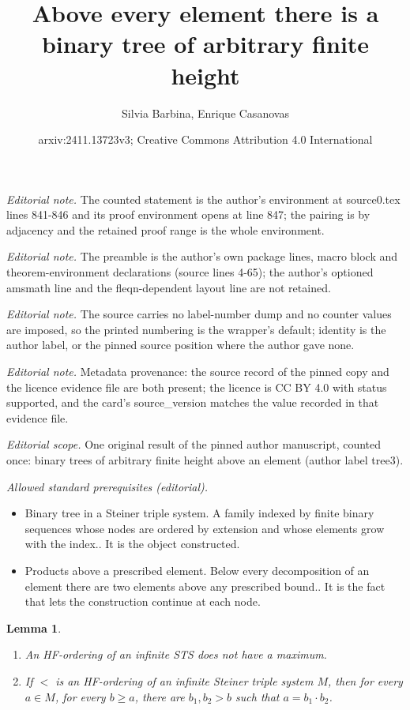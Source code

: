 \documentclass[10pt,a4paper]{article}
\title{Above every element there is a binary tree of arbitrary finite height}
\author{Silvia Barbina, Enrique Casanovas}
\date{arxiv:2411.13723v3; Creative Commons Attribution 4.0 International}
\theoremstyle{note}
\newtheorem{lemma}[thm]{Lemma}
\begin{document}
\maketitle
\noindent\textit{Editorial note.} The counted statement is the author's environment at source0.tex lines 841-846 and its proof environment opens at line 847; the pairing is by adjacency and the retained proof range is the whole environment.\par\medskip
\noindent\textit{Editorial note.} The preamble is the author's own package lines, macro block and theorem-environment declarations (source lines 4-65); the author's optioned amsmath line and the fleqn-dependent layout line are not retained.\par\medskip
\noindent\textit{Editorial note.} The source carries no label-number dump and no counter values are imposed, so the printed numbering is the wrapper's default; identity is the author label, or the pinned source position where the author gave none.\par\medskip
\noindent\textit{Editorial note.} Metadata provenance: the source record of the pinned copy and the licence evidence file are both present; the licence is CC BY 4.0 with status supported, and the card's source\_version matches the value recorded in that evidence file.\par\medskip
\noindent\textit{Editorial scope.} One original result of the pinned author manuscript, counted once: binary trees of arbitrary finite height above an element (author label tree3).\par\medskip
\noindent\textit{Allowed standard prerequisites (editorial).}\begin{itemize}
\item Binary tree in a Steiner triple system. A family indexed by finite binary sequences whose nodes are ordered by extension and whose elements grow with the index.. It is the object constructed.
\item Products above a prescribed element. Below every decomposition of an element there are two elements above any prescribed bound.. It is the fact that lets the construction continue at each node.
\end{itemize}\medskip
\begin{lemma}\label{tree2}
	\begin{enumerate}
		\item An HF-ordering of an infinite STS does not have a maximum.
		\item If $<$ is an HF-ordering of an infinite Steiner triple system $M$, then for every $a\in M$, for every  $b \geq a$, there are $b_1,b_2>b$ such that  $a=b_1\cdot b_2$.
	\end{enumerate}
\end{lemma}
\end{document}
